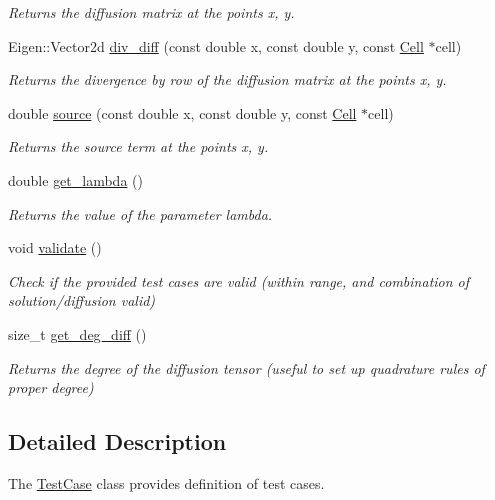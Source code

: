 \begin{DoxyCompactItemize}
\begin{DoxyCompactList}\small\item\em Returns the diffusion matrix at the points x, y. \end{DoxyCompactList}\item 
Eigen\+::\+Vector2d \hyperlink{classTestCase_aa32221ff5dd860c050a28661406a87dc}{div\+\_\+diff} (const double x, const double y, const \hyperlink{classHArDCore2D_1_1Cell}{Cell} $\ast$cell)
\begin{DoxyCompactList}\small\item\em Returns the divergence by row of the diffusion matrix at the points x, y. \end{DoxyCompactList}\item 
double \hyperlink{classTestCase_a5b2e54e9f17ac2ec9c1d675f97fbe335}{source} (const double x, const double y, const \hyperlink{classHArDCore2D_1_1Cell}{Cell} $\ast$cell)
\begin{DoxyCompactList}\small\item\em Returns the source term at the points x, y. \end{DoxyCompactList}\item 
double \hyperlink{group__TestCases_gabb42d3b206c5e89d34ed34f5fe2546e0}{get\+\_\+lambda} ()
\begin{DoxyCompactList}\small\item\em Returns the value of the parameter lambda. \end{DoxyCompactList}\item 
\mbox{\label{classTestCase_a1f428652eb476f6eb4973ef1f478e8ce}} 
void \hyperlink{classTestCase_a1f428652eb476f6eb4973ef1f478e8ce}{validate} ()
\begin{DoxyCompactList}\small\item\em Check if the provided test cases are valid (within range, and combination of solution/diffusion valid) \end{DoxyCompactList}\item 
size\+\_\+t \hyperlink{group__TestCases_ga3dd2daaebb012281b252ab65db0045b2}{get\+\_\+deg\+\_\+diff} ()
\begin{DoxyCompactList}\small\item\em Returns the degree of the diffusion tensor (useful to set up quadrature rules of proper degree) \end{DoxyCompactList}\end{DoxyCompactItemize}


\subsection{Detailed Description}
The \hyperlink{classTestCase}{Test\+Case} class provides definition of test cases. 

